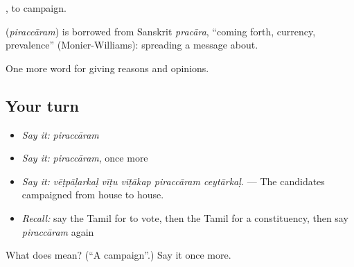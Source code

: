  , to campaign.

\begin{cousinweb}
\textbf{} (\emph{piraccāram}) is borrowed from Sanskrit \emph{pracāra}, \textquotedblleft{}coming forth, currency, prevalence\textquotedblright{} (Monier-Williams): spreading a message about.
\end{cousinweb}

\begin{grammarlens}[title={What you've built}]
One more word for giving reasons and opinions.
\end{grammarlens}

\subsection*{Your turn}
\begin{itemize}
\raggedright
  \item \emph{Say it:} \emph{piraccāram}
  \item \emph{Say it:} \emph{piraccāram}, once more
  \item \emph{Say it:} \emph{vēṭpāḷarkaḷ vīṭu vīṭākap piraccāram ceytārkaḷ.} — The candidates campaigned from house to house.
  \item \emph{Recall:} say the Tamil for to vote, then the Tamil for a constituency, then say \emph{piraccāram} again
\end{itemize}

\begin{tcolorbox}[breakable,colback=teal!4,colframe=teal!35!black,title={Before you move on}]
What does  mean? (\textquotedblleft{}A campaign\textquotedblright{}.) Say it once more.
\end{tcolorbox}
